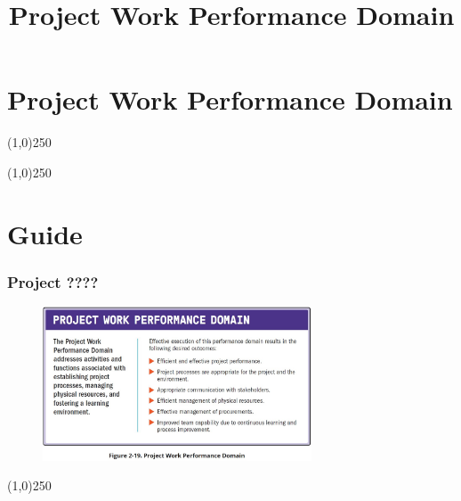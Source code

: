 



%
\title[Project Management \& BIM]{Project Work Performance Domain}



%
\usetikzlibrary{arrows}



\newpage




\thispagestyle{empty}
\tableofcontents
\newpage
\section{Project Work Performance Domain}


\begin{frame}
\titlepage
\end{frame}\begin{center}\line(1,0){250}\end{center}
%
%
\begin{center}\line(1,0){250}\end{center}




\section{Guide}


\begin{frame}
\frametitle{Project ????}
 \begin{figure}
    \centering
        \includegraphics[width = 8cm]{../images/guide/Fig2-19.jpg}
    \label{guidefig:2-19}
 \end{figure}
\end{frame}
\begin{center}\line(1,0){250}\end{center}



